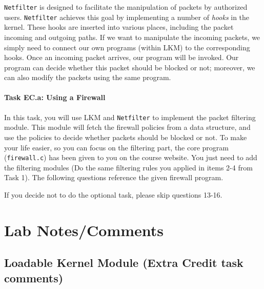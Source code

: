 {\tt Netfilter} is designed to facilitate the manipulation of 
packets by authorized users. {\tt Netfilter} achieves this 
goal by implementing a number of {\em hooks} in the 
\linux kernel. These hooks are inserted into various places, 
including the packet incoming and outgoing paths. 
If we want to manipulate the incoming packets, we simply
need to connect our own programs (within LKM) to the 
corresponding hooks. Once an incoming packet arrives, 
our program will be invoked. Our program can decide 
whether this packet should be blocked or not; moreover,
we can also modify the packets using the same program.

\paragraph{Task EC.a: Using a Firewall}
In this task, you will use LKM and {\tt Netfilter} to implement
the packet filtering module.  This module will fetch 
the firewall policies from a data structure, and use the 
policies to decide whether packets should be blocked or not.
To make your life easier, so you can focus on the filtering part, 
the core program ({\tt firewall.c}) has been given to you on the course website. You just need to add the filtering modules (Do the same filtering rules you applied in items 2-4 from Task 1). The following questions reference the given firewall program.



If you decide not to do the optional task, please skip questions 13-16.


\section{Lab Notes/Comments}

\subsection{Loadable Kernel Module (Extra Credit task comments)}

